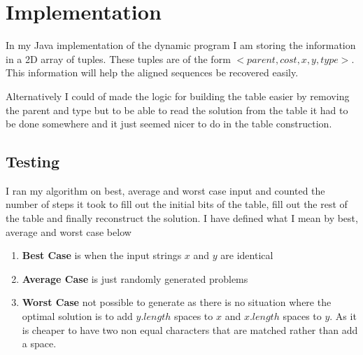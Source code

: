 \documentclass{article}
\begin{document}
  			\section{Implementation}
  				In my Java implementation of the dynamic program I am storing the information in a 2D array of tuples. These tuples are of the form $<parent, cost, x, y, type>$. This information will help the aligned sequences be recovered easily.\newline
  				
  				Alternatively I could of made the logic for building the table easier by removing the parent and type but to be able to read the solution from the table it had to be done somewhere and it just seemed nicer to do in the table construction.
  				
  				\subsection{Testing}
  					I ran my algorithm on best, average and worst case input and counted the number of steps it took to fill out the initial bits of the table, fill out the rest of the table and finally reconstruct the solution. I have defined what I mean by best, average and worst case below
  					
  					\begin{enumerate}
  						\item \textbf{Best Case} is when the input strings $x$ and $y$ are identical
  						
  						\item \textbf{Average Case} is just randomly generated problems
  						
  						\item \textbf{Worst Case} not possible to generate as there is no situation where the optimal solution is to add $y.length$ spaces to $x$ and $x.length$ spaces to $y$. As it is cheaper to have two non equal characters that are matched rather than add a space.
  						
  					\end{enumerate}
									
\end{document}
